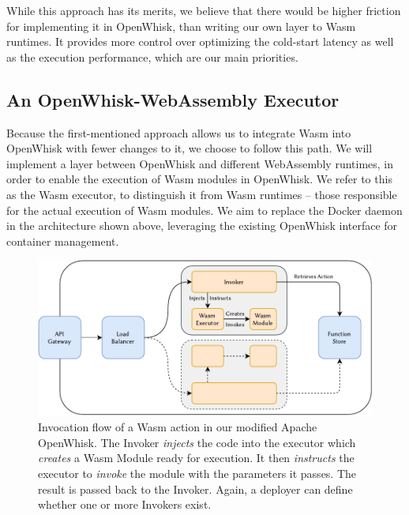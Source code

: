 
While this approach has its merits, we believe that there would be higher friction for implementing it in OpenWhisk, than writing our own layer to Wasm runtimes. It provides more control over optimizing the cold-start latency as well as the execution performance, which are our main priorities.

\subsection{An OpenWhisk-WebAssembly Executor}

Because the first-mentioned approach allows us to integrate Wasm into OpenWhisk with fewer changes to it, we choose to follow this path. We will implement a layer between OpenWhisk and different WebAssembly runtimes, in order to enable the execution of Wasm modules in OpenWhisk. We refer to this as the Wasm executor, to distinguish it from Wasm runtimes -- those responsible for the actual execution of Wasm modules. We aim to replace the Docker daemon in the architecture shown above, leveraging the existing OpenWhisk interface for container management.

\begin{figure}
    \includegraphics{figures/WasmOpenWhiskActionInvocationFlow.pdf}
    \caption{Invocation flow of a Wasm action in our modified Apache OpenWhisk. The Invoker \emph{injects} the code into the executor which \emph{creates} a Wasm Module ready for execution. It then \emph{instructs} the executor to \emph{invoke} the module with the parameters it passes. The result is passed back to the Invoker. Again, a deployer can define whether one or more Invokers exist.}
    \label{fig:wasm-openwhisk-action-invocation-flow}
\end{figure}

